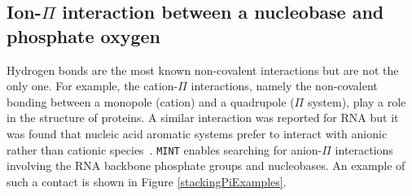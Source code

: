 \documentclass[12pt]{article}
\begin{document}
\subsection{Ion-$\Pi$ interaction between a nucleobase and phosphate oxygen}
Hydrogen bonds are the most known non-covalent interactions but are not the only one. For example, the cation-$\Pi$ interactions, namely the non-covalent bonding between a monopole (cation) and a quadrupole ($\Pi$ system), play a role in the structure of proteins. A similar interaction was reported for RNA but it was found that nucleic acid aromatic systems prefer to interact with anionic rather than cationic species~\cite{Auffinger2013}. 
{\tt MINT} enables searching for anion-$\Pi$ interactions involving the RNA backbone phosphate groups and nucleobases. An example of such a contact is shown in Figure \ref{stackingPiExamples}.
\end{document}
